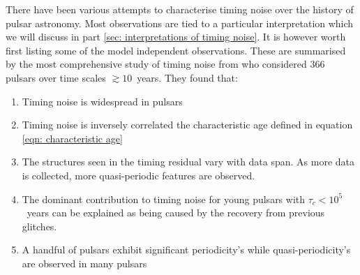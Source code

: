 There have been various attempts to characterise timing noise
over the history of 
pulsar astronomy. Most observations are tied to a particular interpretation
which we will discuss in part \ref{sec: interpretations of timing noise}.
It is however worth first listing some of the model independent observations.
These are summarised by the most comprehensive study of timing noise from 
\citet{Hobbs2010} who considered 366 pulsars over time scales $\gtrsim10$~years.
They found that:
\begin{enumerate}

    \item Timing noise is widespread in pulsars

    \item Timing noise is inversely correlated the characteristic age
        defined in equation \ref{eqn: characteristic age}

    \item The structures seen in the timing residual vary with data span. As
        more data is collected, more quasi-periodic features are observed.

    \item The dominant contribution to timing noise for young pulsars with
        $\tau_{c}<10^{5}$~years can be explained as being caused by the
        recovery from previous glitches.

    \item A handful of pulsars exhibit significant periodicity's while
        quasi-periodicity's are observed in many pulsars

\end{enumerate}


